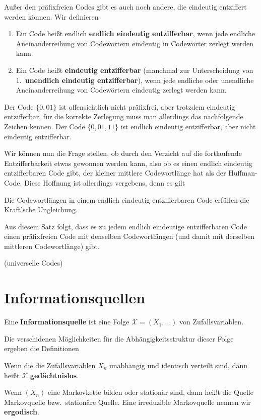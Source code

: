 Außer den präfixfreien Codes gibt es auch noch andere, die eindeutig
entziffert werden können. Wir definieren
\begin{definition}
\begin{enumerate} 
    \item Ein Code heißt endlich \textbf{endlich eindeutig entzifferbar}, wenn
jede endliche Aneinanderreihung von Codewörtern eindeutig in Codewörter
zerlegt werden kann.

\item Ein Code heißt \textbf{eindeutig entzifferbar} (manchmal zur Unterscheidung
    von 1.\ \textbf{unendlich eindeutig entzifferbar}), wenn jede endliche oder
unendliche Aneinanderreihung von Codewörtern eindeutig zerlegt werden kann.
\end{enumerate}
\end{definition}
Der Code $\{0,01\}$ ist offensichtlich nicht präfixfrei, aber trotzdem
eindeutig entzifferbar, für die korrekte Zerlegung muss man allerdings
das nachfolgende Zeichen kennen. Der Code $\{0,01,11\}$ ist endlich
eindeutig entzifferbar, aber nicht eindeutig entzifferbar.

Wir können nun die Frage stellen, ob durch den Verzicht auf die
fortlaufende Entzifferbarkeit etwas gewonnen werden kann, also ob es
einen endlich eindeutig entzifferbaren Code gibt, der kleiner mittlere
Codewortlänge hat als der Huffman-Code. Diese Hoffnung ist allerdings
vergebens, denn es gilt
\begin{satz} Die Codewortlängen in einem endlich eindeutig entzifferbaren
Code erfüllen die Kraft'sche Ungleichung.
\end{satz}
Aus diesem Satz folgt, dass es zu jedem endlich eindeutige entzifferbaren
Code einen präfixfreien Code mit denselben Codewortlängen (und damit
mit derselben mittleren Codewortlänge) gibt.

(universelle Codes)


\section{Informationsquellen}
\begin{definition} Eine \textbf{Informationsquelle} ist eine Folge
$\mathcal X=(X_1,\dots)$ von Zufallsvariablen.
\end{definition}
Die verschidenen Möglichkeiten für die Abhängigkeitsstruktur dieser
Folge ergeben die Definitionen
\begin{definition}
Wenn die die Zufallsvariablen $X_n$ unabhängig und identisch
verteilt sind, dann heißt $\mathcal X$ \textbf{gedächtnislos}.

Wenn $(X_n)$ eine Markovkette bilden oder stationär sind, dann heißt
die Quelle  Markovquelle bzw.\ stationäre Quelle.
Eine irreduzible Markovquelle nennen wir \textbf{ergodisch}.
\end{definition}

